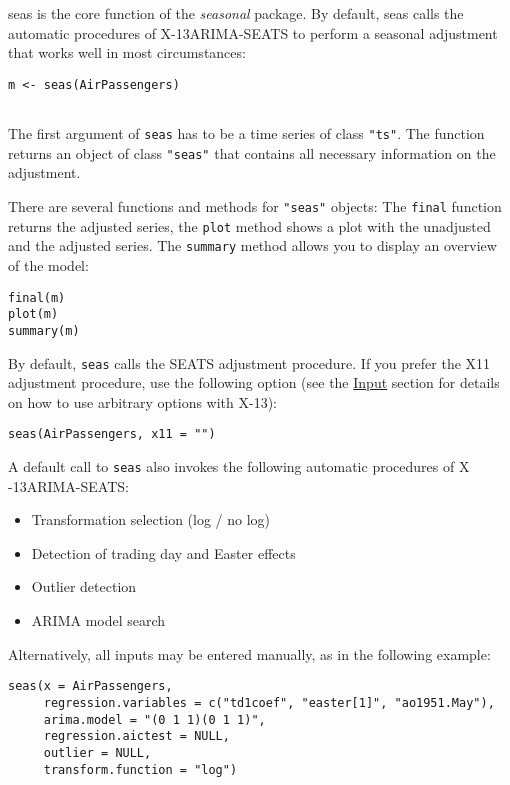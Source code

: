 seas is the core function of the \emph{seasonal} package. By default,
seas calls the automatic procedures of X-13ARIMA-SEATS to perform a
seasonal adjustment that works well in most circumstances:

\begin{verbatim}
m <- seas(AirPassengers)
 
\end{verbatim}

The first argument of \texttt{seas} has to be a time series of class
\texttt{"ts"}. The function returns an object of class \texttt{"seas"}
that contains all necessary information on the adjustment.

There are several functions and methods for \texttt{"seas"} objects: The
\texttt{final} function returns the adjusted series, the \texttt{plot}
method shows a plot with the unadjusted and the adjusted series. The
\texttt{summary} method allows you to display an overview of the model:

\begin{verbatim}
final(m)
plot(m)
summary(m)
\end{verbatim}

By default, \texttt{seas} calls the SEATS adjustment procedure. If you
prefer the X11 adjustment procedure, use the following option (see the
\hyperref[input]{Input} section for details on how to use arbitrary
options with X-13):

\begin{verbatim}
seas(AirPassengers, x11 = "")
\end{verbatim}

A default call to \texttt{seas} also invokes the following automatic
procedures of X -13ARIMA-SEATS:

\begin{itemize}
\itemsep1pt\parskip0pt
\item
  Transformation selection (log / no log)
\item
  Detection of trading day and Easter effects
\item
  Outlier detection
\item
  ARIMA model search
\end{itemize}

Alternatively, all inputs may be entered manually, as in the following
example:

\begin{verbatim}
seas(x = AirPassengers, 
     regression.variables = c("td1coef", "easter[1]", "ao1951.May"), 
     arima.model = "(0 1 1)(0 1 1)", 
     regression.aictest = NULL,
     outlier = NULL, 
     transform.function = "log")
\end{verbatim}

